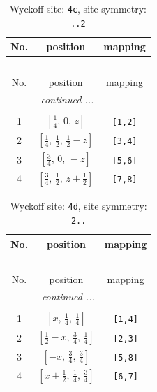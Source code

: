 \documentclass[fleqn,8pt]{jsarticle}
\begin{document}
\renewcommand{\arraystretch}{1.2}
\begin{longtable}{ccc}
\caption{Wyckoff site: {\tt 4c}, site symmetry: {\tt ..2}}
 \\
 \hline \hline
No. & position & mapping \\ \hline \endfirsthead

\multicolumn{2}{l}{\tablename\ \thetable{}} \\
 \hline \hline
No. & position & mapping \\ \hline \endhead

 \hline \hline
\multicolumn{2}{r}{\footnotesize\it continued ...} \\ \endfoot

 \hline \hline
\multicolumn{2}{r}{} \\ \endlastfoot

1 & $\left[ \frac{1}{4},\, 0,\, z \right]$ & {\tt [1,2]} \\ \hline
2 & $\left[ \frac{1}{4},\, \frac{1}{2},\, \frac{1}{2} - z \right]$ & {\tt [3,4]} \\ \hline
3 & $\left[ \frac{3}{4},\, 0,\, - z \right]$ & {\tt [5,6]} \\ \hline
4 & $\left[ \frac{3}{4},\, \frac{1}{2},\, z + \frac{1}{2} \right]$ & {\tt [7,8]} \\
\end{longtable}
\renewcommand{\arraystretch}{1.2}
\begin{longtable}{ccc}
\caption{Wyckoff site: {\tt 4d}, site symmetry: {\tt 2..}}
 \\
 \hline \hline
No. & position & mapping \\ \hline \endfirsthead

\multicolumn{2}{l}{\tablename\ \thetable{}} \\
 \hline \hline
No. & position & mapping \\ \hline \endhead

 \hline \hline
\multicolumn{2}{r}{\footnotesize\it continued ...} \\ \endfoot

 \hline \hline
\multicolumn{2}{r}{} \\ \endlastfoot

1 & $\left[ x,\, \frac{1}{4},\, \frac{1}{4} \right]$ & {\tt [1,4]} \\ \hline
2 & $\left[ \frac{1}{2} - x,\, \frac{3}{4},\, \frac{1}{4} \right]$ & {\tt [2,3]} \\ \hline
3 & $\left[ - x,\, \frac{3}{4},\, \frac{3}{4} \right]$ & {\tt [5,8]} \\ \hline
4 & $\left[ x + \frac{1}{2},\, \frac{1}{4},\, \frac{3}{4} \right]$ & {\tt [6,7]} \\
\end{longtable}
\end{document}
